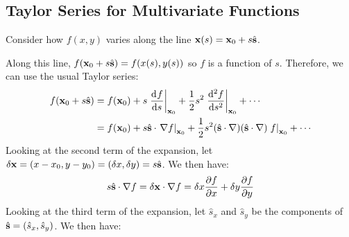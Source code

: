 \documentclass[../main.tex]{subfiles}
\begin{document}
\subsection{Taylor Series for Multivariate Functions}
Consider how $f(x, y)$ varies along the line $\mathbf{\bm{x}}(s) = \mathbf{\bm{x}}_0 + s \hat{\mathbf{\bm{s}}}$.
\begin{center}
\end{center}
Along this line, $f(\mathbf{\bm{x}}_0 + s \hat{\mathbf{\bm{s}}}) = f(x(s), y(s))$ so $f$ is a function of $s$.
Therefore, we can use the usual Taylor series:
\begin{align*}
  f(\vec{x}_0 + s \uvec{s}) &= f(\vec{x}_0) + s \at{\deriv{f}{s}}{\vec{x}_0} + \frac{1}{2}s^2 \at{\deriv[2]{f}{s}}{\vec{x}_0} + \cdots \\
                            &= f(\vec{x}_0) + s \uvec{s} \cdot \at{\nabla f}{\vec{x}_0} + \frac{1}{2}s^2 (\uvec{s} \cdot \nabla)(\uvec{s} \cdot \nabla)\at{f}{\vec{x}_0} + \cdots
\end{align*}
Looking at the second term of the expansion, let $\delta\mathbf{\bm{x}} = (x - x_0, y - y_0) = (\delta x, \delta y) = s \hat{\mathbf{\bm{s}}}$.
We then have:
\[
  s \uvec{s} \cdot \nabla f = \delta \vec{x} \cdot \nabla f = \delta x \pderiv{f}{x} + \delta y \pderiv{f}{y}
\]
Looking at the third term of the expansion, let $\hat{s}_x$ and $\hat{s}_y$ be the components of $\hat{\mathbf{\bm{s}}} =(\hat{s}_x, \hat{s}_y)$.
We then have:
\end{document}
